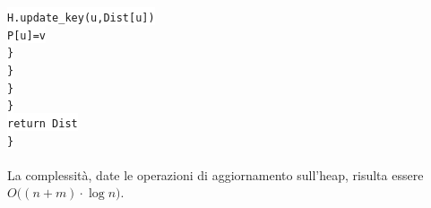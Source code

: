 \documentclass[12pt, letterpaper]{article}
\newcommand{\codee}[1]{\colorbox{white}{\texttt{#1}}}
\newcommand{\acc}{\\\hphantom{}\\}
\begin{document}
\hphantom{ident}\hphantom{ident}\hphantom{ident}\hphantom{ident}\hphantom{ident}\codee{H.update\_key(u,Dist[u])}\\
\hphantom{ident}\hphantom{ident}\hphantom{ident}\hphantom{ident}\hphantom{ident}\codee{P[u]=v}\\
\hphantom{ident}\hphantom{ident}\hphantom{ident}\hphantom{ident}\codee{\}}\\
\hphantom{ident}\hphantom{ident}\hphantom{ident}\codee{\}}\\
\hphantom{ident}\hphantom{ident}\codee{\}}\\
\hphantom{ident}\codee{\}}\\
\hphantom{ident}\codee{return Dist}\\
\codee{\}}\acc
La complessità, date le operazioni di aggiornamento sull'heap, risulta essere $O\big((n+m)\cdot\log{n}\big)$.
\end{document}
